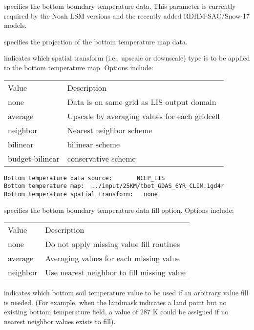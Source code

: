   specifies the bottom boundary
 temperature data.
 This parameter is currently required by the Noah LSM versions
  and the recently added RDHM-SAC/Snow-17 models.

  specifies the projection of the
 bottom temperature map data.

  indicates which spatial
 transform (i.e., upscale or downscale) type is to be applied to 
 the bottom temperature map.  Options include:

 \begin{tabular}{ll}
 Value           & Description                                   \\
 none            & Data is on same grid as LIS output domain     \\
 average         & Upscale by averaging values for each gridcell \\
 neighbor        & Nearest neighbor scheme                       \\
 bilinear        & bilinear scheme                               \\
 budget-bilinear & conservative scheme                           \\
 \end{tabular}
 

 \begin{Verbatim}[frame=single]
Bottom temperature data source:       NCEP_LIS
Bottom temperature map:  ../input/25KM/tbot_GDAS_6YR_CLIM.1gd4r
Bottom temperature spatial transform:   none
 \end{Verbatim}

 
  specifies the bottom boundary
 temperature data fill option.  Options include:

 \begin{tabular}{ll}
 Value    & Description                                \\
 none     & Do not apply missing value fill routines   \\
 average  & Averaging values for each missing value    \\
 neighbor & Use nearest neighbor to fill missing value \\
 \end{tabular}

  indicates which bottom soil 
 temperature value to be used if an arbitrary value fill is needed. 
 (For example, when the landmask indicates a land point but no existing 
 bottom temperature field, a value of 287 K could be assigned if 
 no nearest neighbor values exists to fill).


